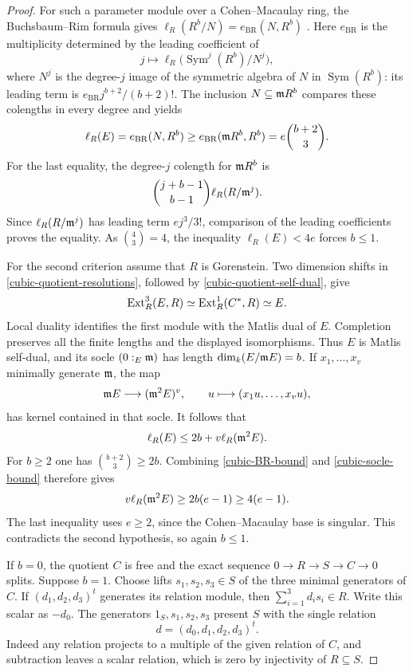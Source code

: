 \begin{proof}
For such a parameter module over a Cohen--Macaulay ring, the
Buchsbaum--Rim formula gives
$\ell_R(R^b/N)=e_{\mathrm{BR}}(N,R^b)$ \cite{BR,HH}.
Here $e_{\mathrm{BR}}$ is the multiplicity determined by the leading
coefficient of
\[
 j\longmapsto
 \ell_R\bigl(\operatorname{Sym}^j(R^b)/N^j\bigr),
\]
where $N^j$ is the degree-$j$ image of the symmetric algebra of
$N$ in $\operatorname{Sym}(R^b)$: its leading term is
$e_{\mathrm{BR}}j^{b+2}/(b+2)!$.
The inclusion $N\subseteq\mathfrak m R^b$ compares these colengths in every
degree and yields
\begin{equation}\label{cubic-BR-bound}
 \ell_R(E)=e_{\mathrm{BR}}(N,R^b)
     \geq e_{\mathrm{BR}}(\mathfrak m R^b,R^b)
     =e\binom{b+2}{3}.
\end{equation}
For the last equality, the degree-$j$ colength for $\mathfrak m R^b$ is
\[
 \binom{j+b-1}{b-1}\ell_R(R/\mathfrak m^j).
\]
Since $\ell_R(R/\mathfrak m^j)$ has leading term $ej^3/3!$, comparison
of the leading coefficients proves the equality.  As
$\binom{4}{3}=4$, the inequality $\ell_R(E)<4e$ forces $b\leq1$.

For the second criterion assume that $R$ is Gorenstein.
Two dimension shifts in \eqref{cubic-quotient-resolutions}, followed
by \eqref{cubic-quotient-self-dual}, give
\[
 \operatorname{Ext}^3_R(E,R)\simeq\operatorname{Ext}^1_R(C^*,R)\simeq E.
\]
Local duality identifies the first module with the Matlis dual
of $E$.  Completion preserves all the finite
lengths and the displayed isomorphisms.
Thus $E$ is Matlis self-dual, and its socle
$(0:_E\mathfrak m)$ has length $\dim_k(E/\mathfrak m E)=b$.
If $x_1,\ldots,x_v$ minimally generate $\mathfrak m$, the map
\[
 \mathfrak m E\longrightarrow(\mathfrak m^2E)^v,
 \qquad u\longmapsto(x_1u,\ldots,x_vu),
\]
has kernel contained in that socle.  It follows that
\begin{equation}\label{cubic-socle-bound}
 \ell_R(E)\leq2b+v\ell_R(\mathfrak m^2E).
\end{equation}
For $b\geq2$ one has $\binom{b+2}{3}\geq2b$.
Combining \eqref{cubic-BR-bound} and \eqref{cubic-socle-bound}
therefore gives
\[
 v\ell_R(\mathfrak m^2E)\geq2b(e-1)\geq4(e-1).
\]
The last inequality uses $e\geq2$, since the Cohen--Macaulay base
is singular.  This contradicts the second hypothesis, so again
$b\leq1$.

If $b=0$, the quotient $C$ is free and the exact sequence
$0\to R\to S\to C\to0$ splits.  Suppose $b=1$.
Choose lifts $s_1,s_2,s_3\in S$ of the three minimal generators
of $C$.  If $(d_1,d_2,d_3)^t$ generates its relation module,
then $\sum_{i=1}^3d_i s_i\in R$.  Write this scalar as $-d_0$.
The generators $1_S,s_1,s_2,s_3$ present $S$ with the single
relation
\[
 d=(d_0,d_1,d_2,d_3)^t.
\]
Indeed any relation projects to a multiple of the given relation
of $C$, and subtraction leaves a scalar relation, which is zero
by injectivity of $R\subseteq S$.


\end{proof}
